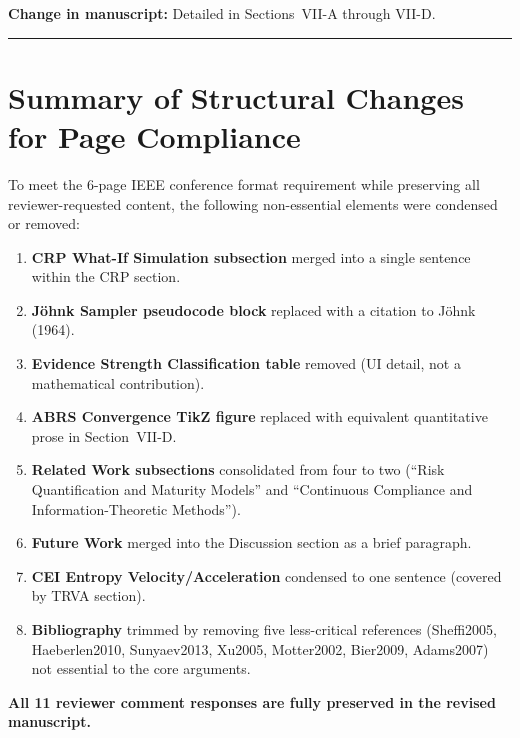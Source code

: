\documentclass[11pt]{article}
\newcommand{\CH}[1]{\noindent\textbf{\color{change}Change in manuscript:} #1\par\medskip}
\begin{document}
\CH{Detailed in Sections~VII-A through VII-D.}

\bigskip
\hrule
\bigskip

\section*{Summary of Structural Changes for Page Compliance}

To meet the 6-page IEEE conference format requirement while preserving all reviewer-requested content, the following non-essential elements were condensed or removed:

\begin{enumerate}[leftmargin=*]
  \item \textbf{CRP What-If Simulation subsection} merged into a single sentence within the CRP section.
  \item \textbf{J\"ohnk Sampler pseudocode block} replaced with a citation to J\"ohnk (1964).
  \item \textbf{Evidence Strength Classification table} removed (UI detail, not a mathematical contribution).
  \item \textbf{ABRS Convergence TikZ figure} replaced with equivalent quantitative prose in Section~VII-D.
  \item \textbf{Related Work subsections} consolidated from four to two (``Risk Quantification and Maturity Models'' and ``Continuous Compliance and Information-Theoretic Methods'').
  \item \textbf{Future Work} merged into the Discussion section as a brief paragraph.
  \item \textbf{CEI Entropy Velocity/Acceleration} condensed to one sentence (covered by TRVA section).
  \item \textbf{Bibliography} trimmed by removing five less-critical references (Sheffi2005, Haeberlen2010, Sunyaev2013, Xu2005, Motter2002, Bier2009, Adams2007) not essential to the core arguments.
\end{enumerate}

\noindent\textbf{All 11 reviewer comment responses are fully preserved in the revised manuscript.}
\end{document}

